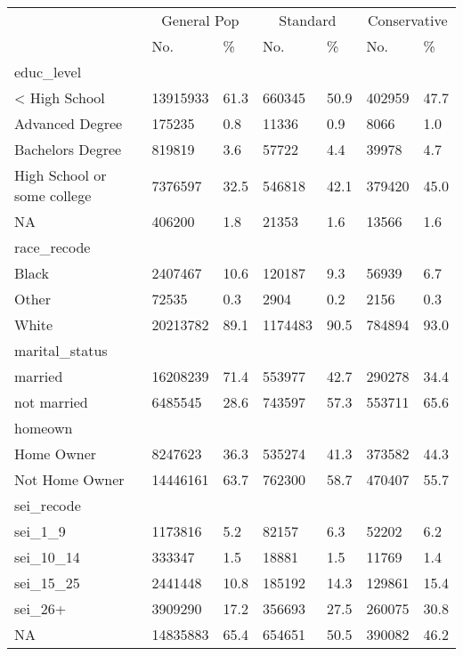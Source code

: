 \captionsetup[table]{labelformat=empty,skip=1pt}
\begin{longtable}{lllllll}
\toprule
& \multicolumn{2}{c}{General Pop} & \multicolumn{2}{c}{Standard} & \multicolumn{2}{c}{Conservative} \\ 
 \cmidrule(lr){2-3}\cmidrule(lr){4-5}\cmidrule(lr){6-7}
 & No. & \% & No. & \% & No. & \% \\ 
\midrule
\multicolumn{1}{l}{educ\_level} \\ 
\midrule
< High School & 13915933 & 61.3 & 660345 & 50.9 & 402959 & 47.7 \\ 
Advanced Degree & 175235 & 0.8 & 11336 & 0.9 & 8066 & 1.0 \\ 
Bachelors Degree & 819819 & 3.6 & 57722 & 4.4 & 39978 & 4.7 \\ 
High School or some college & 7376597 & 32.5 & 546818 & 42.1 & 379420 & 45.0 \\ 
NA & 406200 & 1.8 & 21353 & 1.6 & 13566 & 1.6 \\ 
\midrule
\multicolumn{1}{l}{race\_recode} \\ 
\midrule
Black & 2407467 & 10.6 & 120187 & 9.3 & 56939 & 6.7 \\ 
Other & 72535 & 0.3 & 2904 & 0.2 & 2156 & 0.3 \\ 
White & 20213782 & 89.1 & 1174483 & 90.5 & 784894 & 93.0 \\ 
\midrule
\multicolumn{1}{l}{marital\_status} \\ 
\midrule
married & 16208239 & 71.4 & 553977 & 42.7 & 290278 & 34.4 \\ 
not married & 6485545 & 28.6 & 743597 & 57.3 & 553711 & 65.6 \\ 
\midrule
\multicolumn{1}{l}{homeown} \\ 
\midrule
Home Owner & 8247623 & 36.3 & 535274 & 41.3 & 373582 & 44.3 \\ 
Not Home Owner & 14446161 & 63.7 & 762300 & 58.7 & 470407 & 55.7 \\ 
\midrule
\multicolumn{1}{l}{sei\_recode} \\ 
\midrule
sei\_1\_9 & 1173816 & 5.2 & 82157 & 6.3 & 52202 & 6.2 \\ 
sei\_10\_14 & 333347 & 1.5 & 18881 & 1.5 & 11769 & 1.4 \\ 
sei\_15\_25 & 2441448 & 10.8 & 185192 & 14.3 & 129861 & 15.4 \\ 
sei\_26+ & 3909290 & 17.2 & 356693 & 27.5 & 260075 & 30.8 \\ 
NA & 14835883 & 65.4 & 654651 & 50.5 & 390082 & 46.2 \\ 

\end{longtable}
